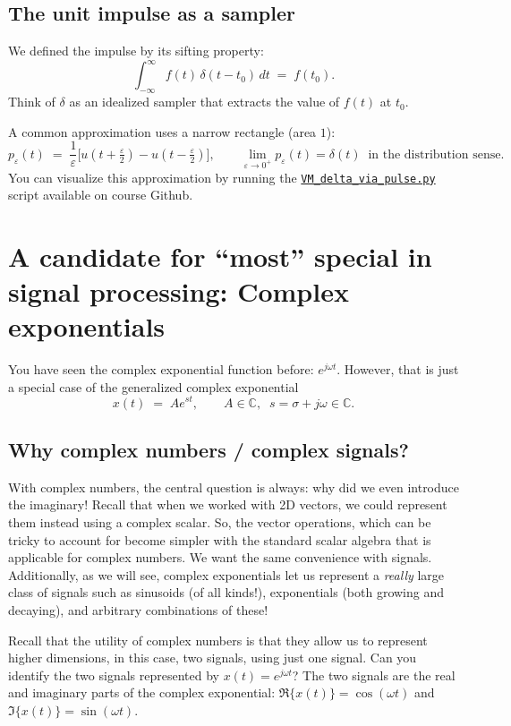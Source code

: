 \subsection{The unit impulse as a sampler}
We defined the impulse by its sifting property:
\[
\int_{-\infty}^{\infty} f(t)\,\delta(t-t_0)\,dt \;=\; f(t_0).
\]
Think of $\delta$ as an idealized sampler that extracts the value of $f(t)$ at $t_0$.

A common approximation uses a narrow rectangle (area $1$):
\[
p_\varepsilon(t)\;=\;\frac{1}{\varepsilon}\Big[u\!\left(t+\tfrac{\varepsilon}{2}\right)-u\!\left(t-\tfrac{\varepsilon}{2}\right)\Big],
\qquad \lim_{\varepsilon\to 0^+} p_\varepsilon(t) = \delta(t)\;\; \text{in the distribution sense.}
\]
You can visualize this approximation by running the \href{https://github.com/ee-ucmerced/ee102-signals-systems/blob/main/lecture\_notes/week2\_signal\_properties/VM_delta_via_pulse.py}{{\tt VM\_delta\_via\_pulse.py}} script available on course Github.

\section{A candidate for ``most'' special in signal processing: Complex exponentials}
You have seen the complex exponential function before: $e^{j\omega t}$. However, that is just a special case of the generalized complex exponential
\[
x(t) \;=\; A e^{s t}, \qquad A\in\mathbb{C},\;\; s=\sigma + j\omega \in \mathbb{C}.
\]
\subsection{Why complex numbers / complex signals?} 

With complex numbers, the central question is always: why did we even introduce the imaginary! Recall that when we worked with 2D vectors, we could represent them instead using a complex scalar. So, the vector operations, which can be tricky to account for become simpler with the standard scalar algebra that is applicable for complex numbers. We want the same convenience with signals. Additionally, as we will see, complex exponentials let us represent a \emph{really} large class of signals such as sinusoids (of all kinds!), exponentials (both growing and decaying), and arbitrary combinations of these!

\begin{popquiz} Recall that the utility of complex numbers is that they allow us to represent higher dimensions, in this case, two signals, using just one signal. Can you identify the two signals represented by $x(t) = e^{j\omega t}$?
\popqsplit 
The two signals are the real and imaginary parts of the complex exponential: $\Re\{x(t)\} = \cos(\omega t)$ and $\Im\{x(t)\} = \sin(\omega t)$.
\end{popquiz}

